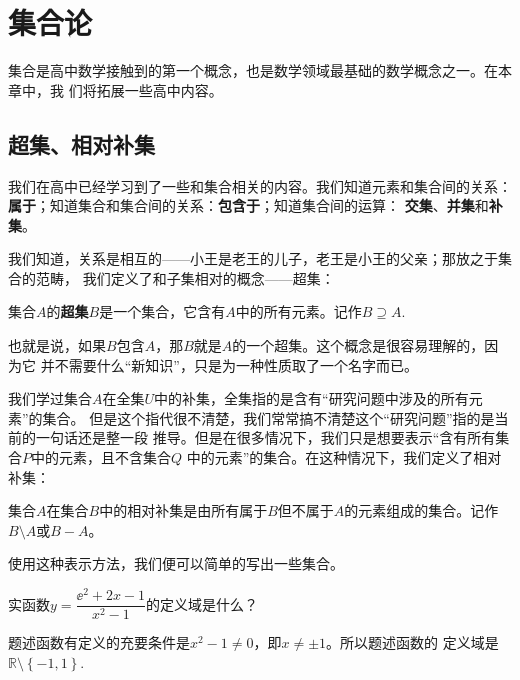 \chapter{集合论} \label{chap:set}

集合是高中数学接触到的第一个概念，也是数学领域最基础的数学概念之一。在本章中，我
们将拓展一些高中内容。

\section{超集、相对补集}

我们在高中已经学习到了一些和集合相关的内容。我们知道元素和集合间的关系：
\textbf{属于}；知道集合和集合间的关系：\textbf{包含于}；知道集合间的运算：
\textbf{交集}、\textbf{并集}和\textbf{补集}。

我们知道，关系是相互的——小王是老王的儿子，老王是小王的父亲；那放之于集合的范畴，
我们定义了和子集相对的概念——超集：

\begin{rawdef}[超集]
    集合$A$的\textbf{超集}$B$是一个集合，它含有$A$中的所有元素。记作$B \supseteq 
    A$.
\end{rawdef}

也就是说，如果$B$包含$A$，那$B$就是$A$的一个超集。这个概念是很容易理解的，因为它
并不需要什么“新知识”，只是为一种性质取了一个名字而已。

我们学过集合$A$在全集$U$中的补集，全集指的是含有“研究问题中涉及的所有元素”的集合。
但是这个指代很不清楚，我们常常搞不清楚这个“研究问题”指的是当前的一句话还是整一段
推导。但是在很多情况下，我们只是想要表示“含有所有集合$P$中的元素，且不含集合$Q$
中的元素”的集合。在这种情况下，我们定义了相对补集：

\begin{rawdef}[相对补集]
    集合$A$在集合$B$中的相对补集是由所有属于$B$但不属于$A$的元素组成的集合。记作
    $B\setminus A$或$B - A$。
\end{rawdef}

使用这种表示方法，我们便可以简单的写出一些集合。

\begin{rawexp}
    实函数$y = \dfrac{\ee^2+2x-1}{x^2-1}$的定义域是什么？
\end{rawexp}

\begin{rawsol}
    题述函数有定义的充要条件是$x^2 -1 \neq 0$，即$x \neq \pm 1$。所以题述函数的
    定义域是$\mathbb{R}\setminus \left\{ -1,1 \right\}$.
\end{rawsol}

